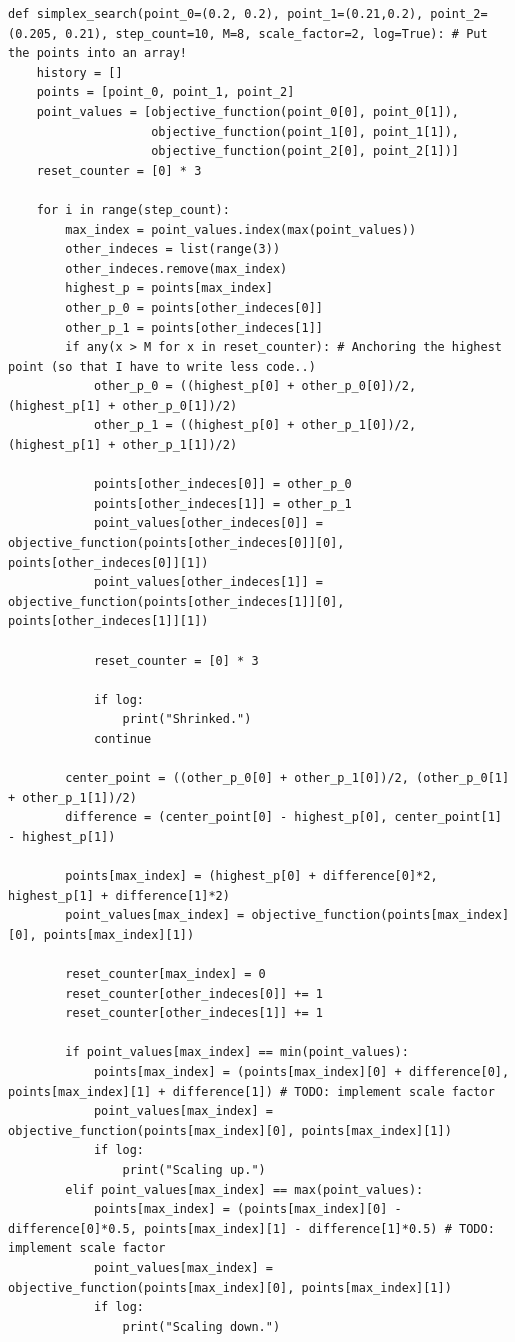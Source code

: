 \documentclass{article}
\begin{document}
        \begin{verbatim}
def simplex_search(point_0=(0.2, 0.2), point_1=(0.21,0.2), point_2=(0.205, 0.21), step_count=10, M=8, scale_factor=2, log=True): # Put the points into an array!
    history = []
    points = [point_0, point_1, point_2]
    point_values = [objective_function(point_0[0], point_0[1]), 
                    objective_function(point_1[0], point_1[1]), 
                    objective_function(point_2[0], point_2[1])]
    reset_counter = [0] * 3

    for i in range(step_count):
        max_index = point_values.index(max(point_values))
        other_indeces = list(range(3))
        other_indeces.remove(max_index)
        highest_p = points[max_index]
        other_p_0 = points[other_indeces[0]]
        other_p_1 = points[other_indeces[1]]
        if any(x > M for x in reset_counter): # Anchoring the highest point (so that I have to write less code..)
            other_p_0 = ((highest_p[0] + other_p_0[0])/2, (highest_p[1] + other_p_0[1])/2)
            other_p_1 = ((highest_p[0] + other_p_1[0])/2, (highest_p[1] + other_p_1[1])/2)

            points[other_indeces[0]] = other_p_0
            points[other_indeces[1]] = other_p_1
            point_values[other_indeces[0]] = objective_function(points[other_indeces[0]][0], points[other_indeces[0]][1])
            point_values[other_indeces[1]] = objective_function(points[other_indeces[1]][0], points[other_indeces[1]][1])

            reset_counter = [0] * 3

            if log:
                print("Shrinked.")
            continue

        center_point = ((other_p_0[0] + other_p_1[0])/2, (other_p_0[1] + other_p_1[1])/2)
        difference = (center_point[0] - highest_p[0], center_point[1] - highest_p[1])

        points[max_index] = (highest_p[0] + difference[0]*2, highest_p[1] + difference[1]*2)
        point_values[max_index] = objective_function(points[max_index][0], points[max_index][1])

        reset_counter[max_index] = 0
        reset_counter[other_indeces[0]] += 1
        reset_counter[other_indeces[1]] += 1

        if point_values[max_index] == min(point_values):
            points[max_index] = (points[max_index][0] + difference[0], points[max_index][1] + difference[1]) # TODO: implement scale factor
            point_values[max_index] = objective_function(points[max_index][0], points[max_index][1])
            if log:
                print("Scaling up.")
        elif point_values[max_index] == max(point_values):
            points[max_index] = (points[max_index][0] - difference[0]*0.5, points[max_index][1] - difference[1]*0.5) # TODO: implement scale factor
            point_values[max_index] = objective_function(points[max_index][0], points[max_index][1])
            if log:
                print("Scaling down.")


\end{verbatim}
\end{document}

